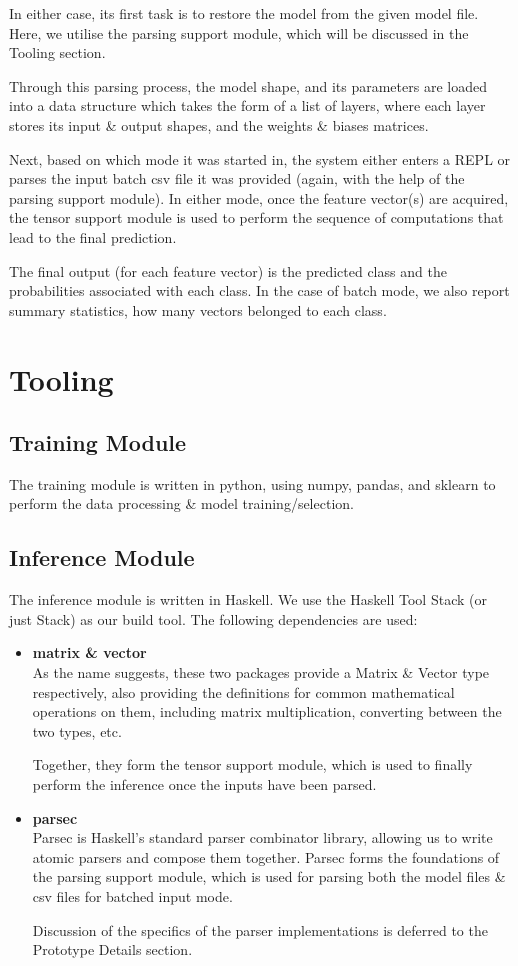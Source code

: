 \documentclass[12pt]{article}
\begin{document}
In either case, its first task is to restore the model from the given model file. Here, we utilise the parsing support module, which will be discussed in the Tooling section.\bigskip

Through this parsing process, the model shape, and its parameters are loaded into a data structure which takes the form of a list of layers, where each layer stores its input \& output shapes, and the weights \& biases matrices.\bigskip

Next, based on which mode it was started in, the system either enters a REPL or parses the input batch csv file it was provided (again, with the help of the parsing support module). In either mode, once the feature vector(s) are acquired, the tensor support module is used to perform the sequence of computations that lead to the final prediction.\bigskip

The final output (for each feature vector) is the predicted class and the probabilities associated with each class. In the case of batch mode, we also report summary statistics, how many vectors belonged to each class.

\section{Tooling}
\subsection{Training Module}
The training module is written in python, using numpy, pandas, and sklearn to perform the data processing \& model training/selection.\bigskip

\subsection{Inference Module}
The inference module is written in Haskell. We use the Haskell Tool Stack (or just Stack) as our build tool. The following dependencies are used:
\begin{itemize}
	\item \textbf{matrix \& vector}\\
	As the name suggests, these two packages provide a Matrix \& Vector type respectively, also providing the definitions for common mathematical operations on them, including matrix multiplication, converting between the two types, etc.\bigskip

	Together, they form the tensor support module, which is used to finally perform the inference once the inputs have been parsed.

	\item \textbf{parsec}\\
	Parsec is Haskell's standard parser combinator library, allowing us to write atomic parsers and compose them together. Parsec forms the foundations of the parsing support module, which is used for parsing both the model files \& csv files for batched input mode.\bigskip

	Discussion of the specifics of the parser implementations is deferred to the Prototype Details section.
\end{itemize}
\end{document}
